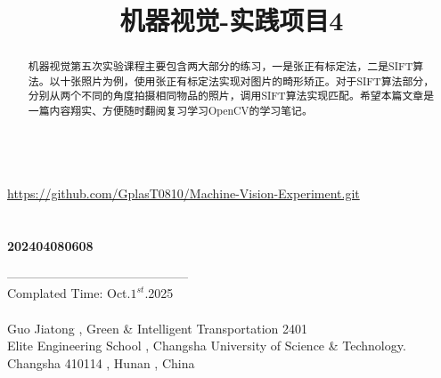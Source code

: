 \documentclass[11pt]{article}
\title{\textbf{{\huge 机器视觉-实践项目4}}}
\begin{document}
    
    \maketitle

	  \vspace*{4em}
	\begin{abstract}
		机器视觉第五次实验课程主要包含两大部分的练习，一是张正有标定法，二是SIFT算法。以十张照片为例，使用张正有标定法实现对图片的畸形矫正。对于SIFT算法部分，分别从两个不同的角度拍摄相同物品的照片，调用SIFT算法实现匹配。希望本篇文章是一篇内容翔实、方便随时翻阅复习学习OpenCV的学习笔记。
	\end{abstract}
	
	\begin{center}
		\\\underline{https://github.com/GplasT0810/Machine-Vision-Experiment.git}\\
		\\
		\\
		\vspace{0.7em}\textbf{{\large 202404080608}}\\
	\end{center}
	\newpage
	
	\tableofcontents
	\begin{center}
		\vspace{15em}
	\end{center}
	
	\vspace*{18em}--------------------------------------------\\
	Complated Time: Oct.$1^{st}$.2025\\ \\
	Guo Jiatong , Green \& Intelligent Transportation 2401\\
	Elite Engineering School , Changsha University of Science \& Technology.\\
	Changsha 410114 , Hunan , China
	
	\newpage
	
	
\end{document}
